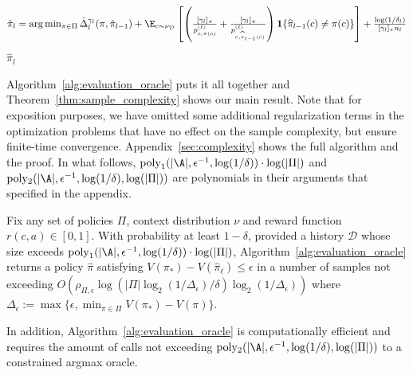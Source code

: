 \documentclass{article}
\newcommand{\mc}[1]{\mathcal{#1}}
\newcommand{\pill}{\widehat{\pi}_{l-1}}
\newcommand{\1}{\mathbf{1}}
\begin{document}
\begin{algorithm}[!htb]
\begin{algorithmic}[1]
{\begin{equation}
   \textstyle \hat{\pi}_l
    =\arg\min_{\pi\in\Pi}\hat{\Delta}_l^{\gamma_l}(\pi,\hat{\pi}_{l-1})+\E_{c\sim\nu_{\mathcal{D}}} \left[ \left(\frac{[\gamma_l]_\pi}{p_{c,\pi(c)}^{(\ell)}}+\frac{[\gamma_l]_\pi}{p_{c,\pill(c)}^{(\ell)}}\right) \1\{\pill(c )\ne \pi(c )\} \right]+\frac{\log(1/\delta_l)}{[\gamma_l]_\pi n_l}\label{eqn:opt_2}
\end{equation}
\vspace{-5pt}}
\ENDFOR
\ENSURE $\hat{\pi}_l$
\end{algorithmic}
\end{algorithm}

Algorithm~\ref{alg:evaluation_oracle} puts it all together and 
Theorem~\ref{thm:sample_complexity} shows our main result. 
Note that for exposition purposes, we have omitted some additional regularization terms in the optimization problems that have no effect on the sample complexity, but ensure finite-time convergence. Appendix~\ref{sec:complexity} shows the full algorithm and the proof. In what follows, $\operatorname{poly}_1(|\A|,\epsilon^{-1},\log(1/\delta))\cdot\log(|\Pi|)$ and $\operatorname{poly_2}(|\A|,\epsilon^{-1},\log(1/\delta),\log(|\Pi|))$ are polynomials in their arguments that specified in the appendix. 

\begin{theorem}\label{thm:sample_complexity}
Fix any set of policies $\Pi$, context distribution $\nu$ and reward function $r(c,a)\in [0,1]$. With probability at least $1-\delta$, provided a history $\mc{D}$ whose size exceeds $\operatorname{poly}_1(|\A|,\epsilon^{-1},\log(1/\delta))\cdot\log(|\Pi|)$, Algorithm~\ref{alg:evaluation_oracle} returns a policy $\hat{\pi}$ satisfying $V(\pi_{\ast}) - V(\hat{\pi}_{\ell})\leq \epsilon$ in a number of samples not exceeding $O(\rho_{\Pi, \epsilon}\log(|\Pi|\log_2(1/\Delta_\epsilon)/\delta)\log_2(1/\Delta_{\epsilon}))$ where $\Delta_{\epsilon} := \max\{\epsilon, \min_{\pi\in \Pi} V(\pi_{\ast}) - V(\pi)\}$. 

In addition, Algorithm~\ref{alg:evaluation_oracle} is computationally efficient and requires the amount of calls not exceeding $\operatorname{poly_2}(|\A|,\epsilon^{-1},\log(1/\delta),\log(|\Pi|))$ to a constrained argmax oracle.

\end{theorem}
\end{document}
